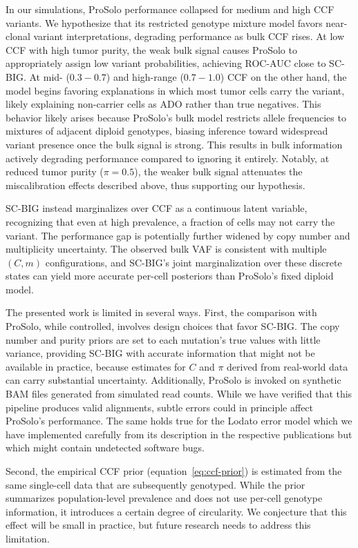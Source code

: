 \documentclass[10pt]{article}
\begin{document}
In our simulations, ProSolo performance collapsed for medium and high CCF variants.
We hypothesize that its restricted genotype mixture model favors near-clonal variant interpretations, degrading performance as bulk CCF rises.
At low CCF with high tumor purity, the weak bulk signal causes ProSolo to appropriately assign low variant probabilities, achieving ROC-AUC close to SC-BIG.
At mid- ($0.3-0.7$) and high-range ($0.7-1.0$) CCF on the other hand, the model begins favoring explanations in which most tumor cells carry the variant, likely explaining non-carrier cells as ADO rather than true negatives.
This behavior likely arises because ProSolo's bulk model restricts allele frequencies to mixtures of adjacent diploid genotypes, biasing inference toward widespread variant presence once the bulk signal is strong.
This results in bulk information actively degrading performance compared to ignoring it entirely.
Notably, at reduced tumor purity ($\pi = 0.5$), the weaker bulk signal attenuates the miscalibration effects described above, thus supporting our hypothesis.

SC-BIG instead marginalizes over CCF as a continuous latent variable, recognizing that even at high prevalence, a fraction of cells may not carry the variant.
The performance gap is potentially further widened by copy number and multiplicity uncertainty.
The observed bulk VAF is consistent with multiple $(C, m)$ configurations, and SC-BIG's joint marginalization over these discrete states can yield more accurate per-cell posteriors than ProSolo's fixed diploid model.

The presented work is limited in several ways.
First, the comparison with ProSolo, while controlled, involves design choices that favor SC-BIG.
The copy number and purity priors are set to each mutation's true values with little variance, providing SC-BIG with accurate information that might not be available in practice, because estimates for $C$ and $\pi$ derived from real-world data can carry substantial uncertainty.
Additionally, ProSolo is invoked on synthetic BAM files generated from simulated read counts.
While we have verified that this pipeline produces valid alignments, subtle errors could in principle affect ProSolo's performance.
The same holds true for the Lodato error model which we have implemented carefully from its description in the respective publications but which might contain undetected software bugs.

Second, the empirical CCF prior (equation~\eqref{eq:ccf-prior}) is estimated from the same single-cell data that are subsequently genotyped.
While the prior summarizes population-level prevalence and does not use per-cell genotype information, it introduces a certain degree of circularity.
We conjecture that this effect will be small in practice, but future research needs to address this limitation.
\end{document}
